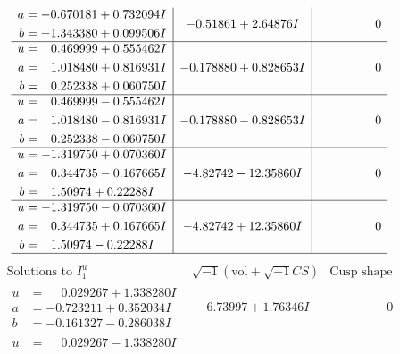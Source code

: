 \documentclass[1p]{elsarticle_modified}
\theoremstyle{definition}
\newcommand{\I}{\sqrt{-1}}
\begin{document}
$$\begin{array}{c|c|c}
\begin{aligned}
a &= -0.670181 + 0.732094 I \\
b &= -1.343380 + 0.099506 I\end{aligned}
 & -0.51861 + 2.64876 I & \phantom{-0.000000 } 0 \\ \hline\begin{aligned}
u &= \phantom{-}0.469999 + 0.555462 I \\
a &= \phantom{-}1.018480 + 0.816931 I \\
b &= \phantom{-}0.252338 + 0.060750 I\end{aligned}
 & -0.178880 + 0.828653 I & \phantom{-0.000000 } 0 \\ \hline\begin{aligned}
u &= \phantom{-}0.469999 - 0.555462 I \\
a &= \phantom{-}1.018480 - 0.816931 I \\
b &= \phantom{-}0.252338 - 0.060750 I\end{aligned}
 & -0.178880 - 0.828653 I & \phantom{-0.000000 } 0 \\ \hline\begin{aligned}
u &= -1.319750 + 0.070360 I \\
a &= \phantom{-}0.344735 - 0.167665 I \\
b &= \phantom{-}1.50974 + 0.22288 I\end{aligned}
 & -4.82742 - 12.35860 I & \phantom{-0.000000 } 0 \\ \hline\begin{aligned}
u &= -1.319750 - 0.070360 I \\
a &= \phantom{-}0.344735 + 0.167665 I \\
b &= \phantom{-}1.50974 - 0.22288 I\end{aligned}
 & -4.82742 + 12.35860 I & \phantom{-0.000000 } 0\\
 \hline 
 \end{array}$$\newpage$$\begin{array}{c|c|c}  
\text{Solutions to }I^u_{1}& \I (\text{vol} + \sqrt{-1}CS) & \text{Cusp shape}\\
 \hline 
\begin{aligned}
u &= \phantom{-}0.029267 + 1.338280 I \\
a &= -0.723211 + 0.352034 I \\
b &= -0.161327 - 0.286038 I\end{aligned}
 & \phantom{-}6.73997 + 1.76346 I & \phantom{-0.000000 } 0 \\ \hline\begin{aligned}
u &= \phantom{-}0.029267 - 1.338280 I \\

\end{aligned}
\end{array}$$
\end{document}
